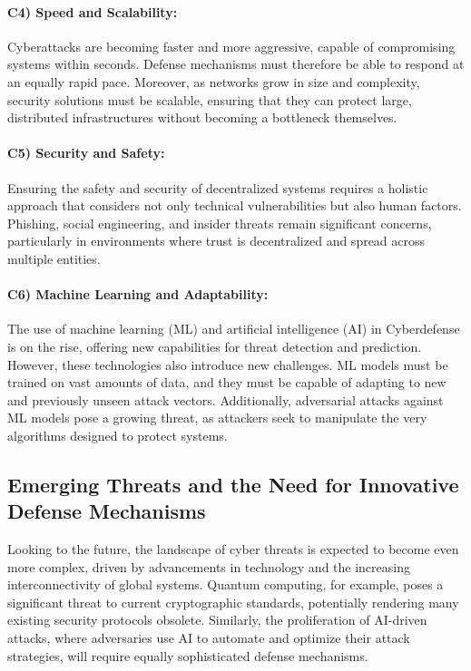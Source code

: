 \paragraph{C4) Speed and Scalability:}
Cyberattacks are becoming faster and more aggressive, capable of compromising systems within seconds. Defense mechanisms must therefore be able to respond at an equally rapid pace. Moreover, as networks grow in size and complexity, security solutions must be scalable, ensuring that they can protect large, distributed infrastructures without becoming a bottleneck themselves.

\paragraph{C5) Security and Safety:}
Ensuring the safety and security of decentralized systems requires a holistic approach that considers not only technical vulnerabilities but also human factors. Phishing, social engineering, and insider threats remain significant concerns, particularly in environments where trust is decentralized and spread across multiple entities.

\paragraph{C6) Machine Learning and Adaptability:}
The use of machine learning (ML) and artificial intelligence (AI) in Cyberdefense is on the rise, offering new capabilities for threat detection and prediction. However, these technologies also introduce new challenges. ML models must be trained on vast amounts of data, and they must be capable of adapting to new and previously unseen attack vectors. Additionally, adversarial attacks against ML models pose a growing threat, as attackers seek to manipulate the very algorithms designed to protect systems.

\subsection{Emerging Threats and the Need for Innovative Defense Mechanisms}

Looking to the future, the landscape of cyber threats is expected to become even more complex, driven by advancements in technology and the increasing interconnectivity of global systems. Quantum computing, for example, poses a significant threat to current cryptographic standards, potentially rendering many existing security protocols obsolete. Similarly, the proliferation of AI-driven attacks, where adversaries use AI to automate and optimize their attack strategies, will require equally sophisticated defense mechanisms.

